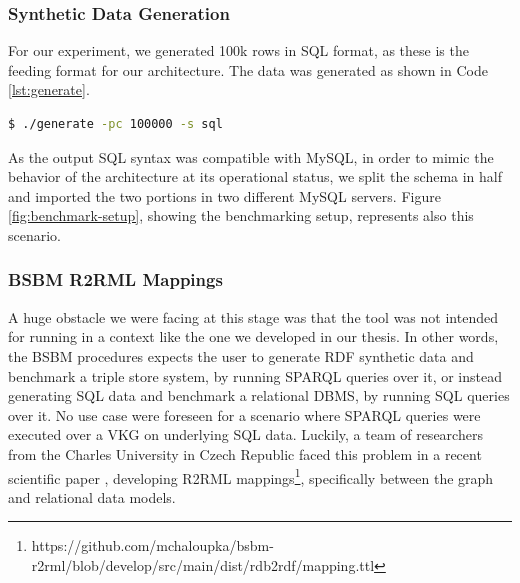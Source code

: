 \subsubsection{Synthetic Data Generation}
For our experiment, we generated 100k rows in \ac{SQL} format, as these is the feeding format for our architecture. The data was generated as shown in Code \ref{lst:generate}.
\begin{lstlisting}[language=bash, caption={BSBM generator script that invokes Generator class and \ac{JAR} executor}, label={lst:generate}]
    $ ./generate -pc 100000 -s sql
\end{lstlisting}
As the output \ac{SQL} syntax was compatible with MySQL, in order to mimic the behavior of the architecture at its operational status, we split the schema in half and imported the two portions in two different MySQL servers. Figure \ref{fig:benchmark-setup}, showing the benchmarking setup, represents also this scenario.

\subsubsection{BSBM R2RML Mappings}
A huge obstacle we were facing at this stage was that the tool was not intended for running in a context like the one we developed in our thesis. In other words, the \ac{BSBM}  procedures expects the user to generate \ac{RDF} synthetic data and benchmark a triple store system, by running \ac{SPARQL} queries over it, or instead generating \ac{SQL} data and benchmark a relational \ac{DBMS}, by running \ac{SQL} queries over it. No use case were foreseen for a scenario where \ac{SPARQL} queries were executed over a \ac{VKG} on underlying \ac{SQL} data.
Luckily, a team of researchers from the Charles University in Czech Republic faced this problem in a recent scientific paper \cite{DBLP:journals/dke/ChaloupkaN24}, developing R2RML mappings\footnote{https://github.com/mchaloupka/bsbm-r2rml/blob/develop/src/main/dist/rdb2rdf/mapping.ttl}, specifically between the graph and relational data models.

